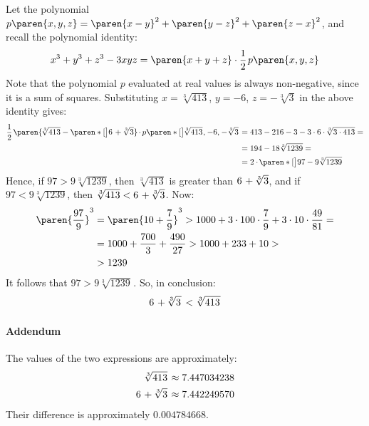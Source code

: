 Let the polynomial $p\paren{x, y, z} = \paren{x - y}^2 + \paren{y - z}^2 + \paren{z - x}^2$,
and recall the polynomial identity:
\begin{equation*}
  x^3 + y^3 + z^3 - 3 x y z = \paren{x + y + z} \cdot \frac{1}{2} \mspace{2mu} p\paren{x, y, z}
\end{equation*}
Note that the polynomial $p$ evaluated at real values is always non-negative, since it is a sum of squares.
Substituting $x = \sqrt[3]{413}$, $y = - 6$, $z = - \sqrt[3]{3}$ in the above identity gives:
\begin{align*}
  \frac{1}{2} \mspace{2mu} \paren{\mspace{-2mu} \sqrt[3]{413} - \paren*[\big]{6 \mspace{2mu} + \mspace{-1mu} \sqrt[3]{3} \mspace{2mu}} \mspace{-2mu}}
  \mspace{-2mu} \cdot \mspace{-1.2mu} p\paren*[\big]{\mspace{-2mu} \sqrt[3]{413} \mspace{1mu}, \mspace{1mu} - 6, \mspace{1mu} - \sqrt[3]{3} \mspace{2mu}}
  &= 413 - 216 - 3 - 3 \cdot 6 \cdot \mspace{-1.5mu} \sqrt[3]{3 \cdot 413} = \\
  &= 194 - 18 \sqrt[3]{1239} = \\
  &= 2 \cdot \mspace{-2mu} \paren*[\big]{97 - 9 \sqrt[3]{1239} \mspace{2mu}}
\end{align*}
Hence, if $97 > 9 \sqrt[3]{1239}$, then $\sqrt[3]{413}$ is greater than $6 \mspace{2mu} + \mspace{-1mu} \sqrt[3]{3}$,
and if $97 < 9 \sqrt[3]{1239}$, then $\sqrt[3]{413} < 6 \mspace{2mu} + \mspace{-1mu} \sqrt[3]{3}$.
Now:
\begin{align*}
  \paren{\frac{97}{9}}^3
  &= \paren{10 + \frac{7}{9}}^3
   > 1000 + 3 \cdot 100 \cdot \frac{7}{9} + 3 \cdot 10 \cdot \frac{49}{81} = \\
  &= 1000 + \frac{700}{3} + \frac{490}{27}
   > 1000 + 233 + 10 > \\
  &> 1239
\end{align*}
It follows that $97 > 9 \sqrt[3]{1239 \mspace{1mu}} \mspace{1mu}$.
So, in conclusion:
\begin{equation*}
  6 \mspace{2mu} + \mspace{-1mu} \sqrt[3]{3 \mspace{1mu}} \mspace{2mu}
  <
  \sqrt[3]{413 \mspace{1mu}}
\end{equation*}

\paragraph{Addendum}
The values of the two expressions are approximately:
\begin{align*}
  \sqrt[3]{413} \mspace{2mu}                                &\approx   7.447034238 \\
  6 \mspace{2mu} + \mspace{-1mu} \sqrt[3]{3} \mspace{2mu}   &\approx   7.442249570
\end{align*}
Their difference is approximately $0.004784668$.
